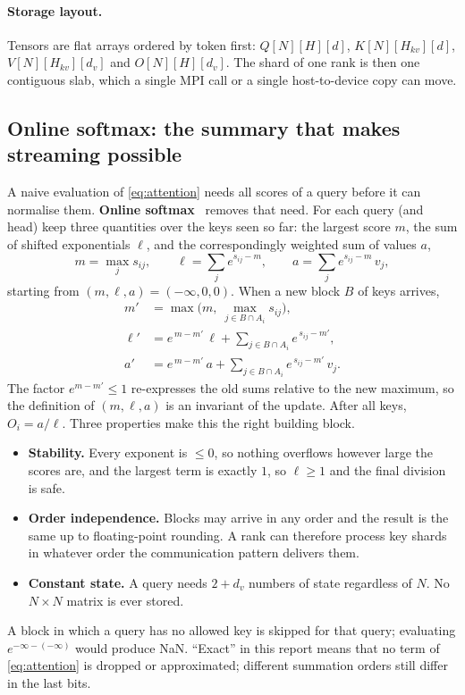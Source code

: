 \documentclass[10pt,a4paper]{article}
\newcommand{\term}[1]{\textbf{#1}}
\begin{document}
\paragraph{Storage layout.} Tensors are flat arrays ordered by token first:
$Q[N][H][d]$, $K[N][H_{kv}][d]$, $V[N][H_{kv}][d_v]$ and $O[N][H][d_v]$. The shard of
one rank is then one contiguous slab, which a single MPI call or a single
host-to-device copy can move.

\subsection{Online softmax: the summary that makes streaming possible}
A naive evaluation of \cref{eq:attention} needs all scores of a query before it can
normalise them. \term{Online softmax}~\cite{online} removes that need. For each query
(and head) keep three quantities over the keys seen so far: the largest score $m$,
the sum of shifted exponentials $\ell$, and the correspondingly weighted sum of
values $a$,
\[
 m=\max_j s_{ij},\qquad \ell=\sum_j e^{s_{ij}-m},\qquad a=\sum_j e^{s_{ij}-m}\,v_j ,
\]
starting from $(m,\ell,a)=(-\infty,0,0)$. When a new block $B$ of keys arrives,
\begin{align}
 m' &= \max\bigl(m,\ \max_{j\in B\cap A_i}s_{ij}\bigr), \nonumber\\
 \ell' &= e^{\,m-m'}\,\ell+\sum_{j\in B\cap A_i}e^{\,s_{ij}-m'}, \label{eq:online}\\
 a' &= e^{\,m-m'}\,a+\sum_{j\in B\cap A_i}e^{\,s_{ij}-m'}\,v_j . \nonumber
\end{align}
The factor $e^{m-m'}\le 1$ re-expresses the old sums relative to the new maximum, so
the definition of $(m,\ell,a)$ is an invariant of the update. After all keys,
$O_i=a/\ell$. Three properties make this the right building block.
\begin{itemize}
\item \textbf{Stability.} Every exponent is $\le 0$, so nothing overflows however
large the scores are, and the largest term is exactly $1$, so $\ell\ge 1$ and the
final division is safe.
\item \textbf{Order independence.} Blocks may arrive in any order and the result is
the same up to floating-point rounding. A rank can therefore process key shards in
whatever order the communication pattern delivers them.
\item \textbf{Constant state.} A query needs $2+d_v$ numbers of state regardless of
$N$. No $N\times N$ matrix is ever stored.
\end{itemize}
A block in which a query has no allowed key is skipped for that query; evaluating
$e^{-\infty-(-\infty)}$ would produce NaN. ``Exact'' in this report means that no
term of \cref{eq:attention} is dropped or approximated; different summation orders
still differ in the last bits.
\end{document}
